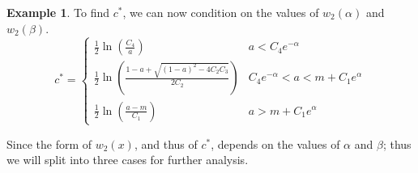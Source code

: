 \documentclass[11pt]{article}
\theoremstyle{definition}
\newtheorem{ex}[thm]{Example}
\numberwithin{equation}{section}
\numberwithin{thm}{section}
\renewcommand{\a}{\alpha}
\renewcommand{\b}{\beta}
\begin{document}
\begin{ex}
To find $c^*$, we can now condition on the values of $w_2(\alpha)$ and $w_2(\beta)$.
%
%
%
%
%
%
%
%
%
%
%
\begin{equation}
c^* = \begin{cases}
\frac{1}{2} \ln \left( \frac{C_4}{a} \right) & a<C_4e^{-\alpha} \\
\frac{1}{2} \ln \left( \frac{1-a + \sqrt{(1-a)^2 - 4C_2C_3}}{2C_2} \right) & C_4e^{-\alpha}<a<m+C_1e^\alpha\\
\frac{1}{2} \ln \left( \frac{a-m}{C_1}\right) & a>m+C_1e^\alpha
\end{cases}
\end{equation}

Since the form of $w_2(x)$, and thus of $c^*$, depends on the values of $\a$ and $\b$; thus we will split into three cases for further analysis.


\end{ex}
\end{document}

